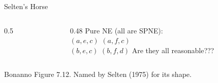 \begin{frame}{Selten's Horse}
\begin{columns}[c]
\begin{column}{0.5\textwidth}
\centering
\horse
\end{column}
\begin{column}{0.48\textwidth}
Pure NE (all are SPNE):\\[6pt]
$(a,e,c)$ \quad $(a,f,c)$\\[4pt]
$(b,e,c)$ \quad $(b,f,d)$
\bsk
Are they all reasonable???
\end{column}
\end{columns}
\vfill
{\footnotesize Bonanno Figure 7.12. Named by Selten (1975) for its shape.}
\vspace{-0.2in}
\end{frame}


